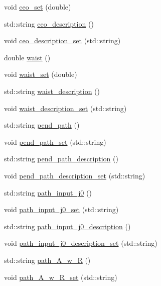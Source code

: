 \begin{DoxyCompactItemize}
void \hyperlink{class_config___settings_ad5a6d758ff0ffbde06f5fac2a83a0b4a}{ceo\+\_\+set} (double)
\item 
std\+::string \hyperlink{class_config___settings_a962f900e5aa7497f50b3f6fa9a6c58e3}{ceo\+\_\+description} ()
\item 
void \hyperlink{class_config___settings_a4b3d3758bfb8c9934224c16f5e25dcd3}{ceo\+\_\+description\+\_\+set} (std\+::string)
\item 
double \hyperlink{class_config___settings_a9bec079708e647e77006394d68ea3ad3}{waist} ()
\item 
void \hyperlink{class_config___settings_aebe0df8b04a71ab41e8335a967ae10c4}{waist\+\_\+set} (double)
\item 
std\+::string \hyperlink{class_config___settings_a849ae9f7a6ef85215c04a79004ac129b}{waist\+\_\+description} ()
\item 
void \hyperlink{class_config___settings_a54a52d9c629a4675067bd60878482b53}{waist\+\_\+description\+\_\+set} (std\+::string)
\item 
std\+::string \hyperlink{class_config___settings_a5586e450111a71ad50709abea538cc7c}{pend\+\_\+path} ()
\item 
void \hyperlink{class_config___settings_a304590e5ee1997f8ba77b8f5b8616a0a}{pend\+\_\+path\+\_\+set} (std\+::string)
\item 
std\+::string \hyperlink{class_config___settings_ae04c1b7c25a401f257fde7e84d99de6c}{pend\+\_\+path\+\_\+description} ()
\item 
void \hyperlink{class_config___settings_a2127dbabc25c78bc4b246ccb28b54823}{pend\+\_\+path\+\_\+description\+\_\+set} (std\+::string)
\item 
std\+::string \hyperlink{class_config___settings_ab682248f3c8b4c10e054bea596fbe469}{path\+\_\+input\+\_\+j0} ()
\item 
void \hyperlink{class_config___settings_a26b52f3513a4f3600623c08c04180a73}{path\+\_\+input\+\_\+j0\+\_\+set} (std\+::string)
\item 
std\+::string \hyperlink{class_config___settings_ae43bda83ee14a6793aa4bbd7fa02fa32}{path\+\_\+input\+\_\+j0\+\_\+description} ()
\item 
void \hyperlink{class_config___settings_ac9c656a69714750f44376d12e2e4234d}{path\+\_\+input\+\_\+j0\+\_\+description\+\_\+set} (std\+::string)
\item 
std\+::string \hyperlink{class_config___settings_a065df8358546e8cd33d1a667f302821c}{path\+\_\+\+A\+\_\+w\+\_\+R} ()
\item 
void \hyperlink{class_config___settings_a22b7f1635047eeccd8c4db2795e6c560}{path\+\_\+\+A\+\_\+w\+\_\+\+R\+\_\+set} (std\+::string)

\end{DoxyCompactItemize}
